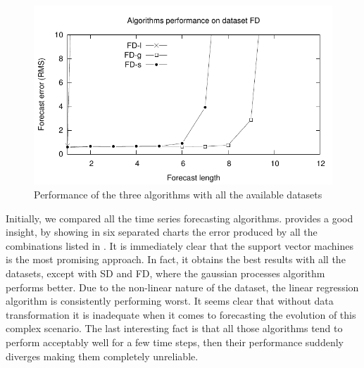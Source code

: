 \documentclass[12pt,a4paper,twoside,openright]{book}
\begin{document}
\begin{figure}
	\parbox{0.5\columnwidth}{\includegraphics[width=0.49\columnwidth]{img/algorithms-fd}}
\caption{Performance of the three algorithms with all the available datasets}
\label{img:algorithms}
\end{figure}
%
Initially, we compared all the time series forecasting algorithms.
%
 provides a good insight, by showing in six separated charts the error produced by all the combinations listed in .
%
It is immediately clear that the support vector machines is the most promising approach.
%
In fact, it obtains the best results with all the datasets, except with SD and FD, where the gaussian processes algorithm performs better.
%
Due to the non-linear nature of the dataset, the linear regression algorithm is consistently performing worst. It seems clear that without data transformation it is inadequate when it comes to forecasting the evolution of this complex scenario.
%
The last interesting fact is that all those algorithms tend to perform acceptably well for a few time steps, then their performance suddenly diverges making them completely unreliable.
\end{document}
